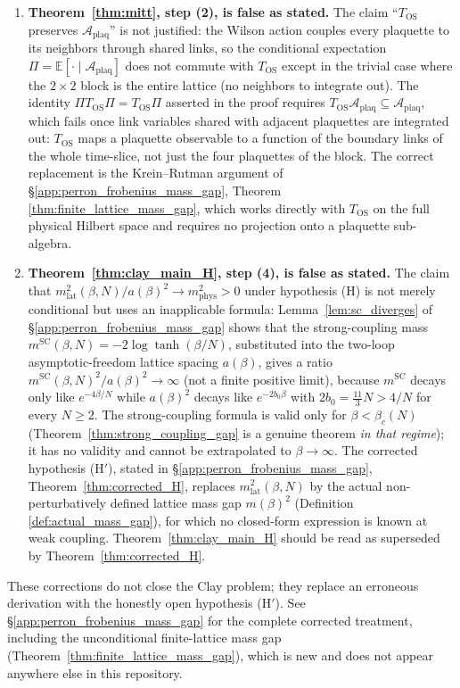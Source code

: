 \begin{enumerate}
\item \textbf{Theorem~\ref{thm:mitt}, step (2), is false as stated.}
The claim ``$T_{\mathrm{OS}}$ preserves $\mathcal{A}_{\mathrm{plaq}}$''
is not justified: the Wilson action couples every plaquette to its
neighbors through shared links, so the conditional expectation
$\Pi=\mathbb{E}[\cdot\mid\mathcal{A}_{\mathrm{plaq}}]$ does not commute
with $T_{\mathrm{OS}}$ except in the trivial case where the $2\times2$
block is the entire lattice (no neighbors to integrate out). The
identity $\Pi T_{\mathrm{OS}}\Pi = T_{\mathrm{OS}}\Pi$ asserted in the
proof requires $T_{\mathrm{OS}}\mathcal{A}_{\mathrm{plaq}}\subseteq
\mathcal{A}_{\mathrm{plaq}}$, which fails once link variables shared
with adjacent plaquettes are integrated out: $T_{\mathrm{OS}}$ maps a
plaquette observable to a function of the boundary links of the whole
time-slice, not just the four plaquettes of the block. The correct
replacement is the Krein--Rutman argument of
\S\ref{app:perron_frobenius_mass_gap}, Theorem
\ref{thm:finite_lattice_mass_gap}, which works directly with
$T_{\mathrm{OS}}$ on the full physical Hilbert space and requires no
projection onto a plaquette sub-algebra.

\item \textbf{Theorem~\ref{thm:clay_main_H}, step (4), is false as
stated.} The claim that
$m_{\mathrm{lat}}^{2}(\beta,N)/a(\beta)^{2}\to m_{\mathrm{phys}}^{2}>0$
under hypothesis (H) is not merely conditional but uses an inapplicable
formula: Lemma~\ref{lem:sc_diverges} of
\S\ref{app:perron_frobenius_mass_gap} shows that the strong-coupling
mass $m^{\mathrm{SC}}(\beta,N)=-2\log\tanh(\beta/N)$, substituted into
the two-loop asymptotic-freedom lattice spacing $a(\beta)$, gives a
ratio $m^{\mathrm{SC}}(\beta,N)^{2}/a(\beta)^{2}\to\infty$ (not a finite
positive limit), because $m^{\mathrm{SC}}$ decays only like
$e^{-4\beta/N}$ while $a(\beta)^{2}$ decays like $e^{-2b_{0}\beta}$
with $2b_{0}=\tfrac{11}{3}N>4/N$ for every $N\ge2$. The strong-coupling
formula is valid only for $\beta<\beta_{c}(N)$
(Theorem~\ref{thm:strong_coupling_gap} is a genuine theorem \emph{in
that regime}); it has no validity and cannot be extrapolated to
$\beta\to\infty$. The corrected hypothesis (H$'$), stated in
\S\ref{app:perron_frobenius_mass_gap}, Theorem~\ref{thm:corrected_H},
replaces $m_{\mathrm{lat}}^{2}(\beta,N)$ by the actual
non-perturbatively defined lattice mass gap $m(\beta)^{2}$ (Definition
\ref{def:actual_mass_gap}), for which no closed-form expression is
known at weak coupling. Theorem~\ref{thm:clay_main_H} should be read as
superseded by Theorem~\ref{thm:corrected_H}.
\end{enumerate}

These corrections do not close the Clay problem; they replace an
erroneous derivation with the honestly open hypothesis (H$'$). See
\S\ref{app:perron_frobenius_mass_gap} for the complete corrected
treatment, including the unconditional finite-lattice mass gap
(Theorem~\ref{thm:finite_lattice_mass_gap}), which is new and does not
appear anywhere else in this repository.

\endinput
